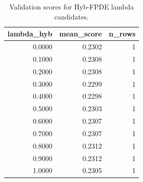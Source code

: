 \begin{table}[t]
\caption{Validation scores for Hyb-FPDE lambda candidates.}
\label{tab:lambda_distribution_computed}
\centering
\begin{tabular}{rrr}
\toprule
lambda\_hyb & mean\_score & n\_rows \\
\midrule
0.0000 & 0.2302 & 1 \\
0.1000 & 0.2308 & 1 \\
0.2000 & 0.2308 & 1 \\
0.3000 & 0.2299 & 1 \\
0.4000 & 0.2298 & 1 \\
0.5000 & 0.2303 & 1 \\
0.6000 & 0.2307 & 1 \\
0.7000 & 0.2307 & 1 \\
0.8000 & 0.2312 & 1 \\
0.9000 & 0.2312 & 1 \\
1.0000 & 0.2305 & 1 \\
\bottomrule
\end{tabular}

\end{table}
